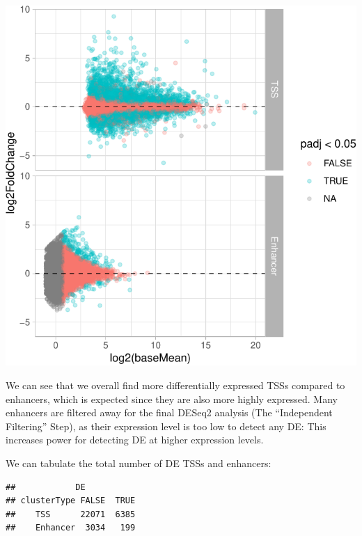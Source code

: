 \documentclass[9pt,a4paper,]{extarticle}
\newenvironment{Shaded}{\begin{snugshade}}{\end{snugshade}}
\newcommand{\KeywordTok}[1]{\textcolor[rgb]{0.13,0.29,0.53}{\textbf{{#1}}}}
\newcommand{\DataTypeTok}[1]{\textcolor[rgb]{0.13,0.29,0.53}{{#1}}}
\newcommand{\FloatTok}[1]{\textcolor[rgb]{0.00,0.00,0.81}{{#1}}}
\newcommand{\NormalTok}[1]{{#1}}
\begin{document}
\begin{center}\includegraphics{CAGEWorkflow_files/figure-latex/MAplot-1} \end{center}

We can see that we overall find more differentially expressed TSSs compared to enhancers, which is expected since they are also more highly expressed. Many enhancers are filtered away for the final DESeq2 analysis (The ``Independent Filtering'' Step), as their expression level is too low to detect any DE: This increases power for detecting DE at higher expression levels.

We can tabulate the total number of DE TSSs and enhancers:

\begin{Shaded}
\end{Shaded}

\begin{verbatim}
##            DE
## clusterType FALSE  TRUE
##    TSS      22071  6385
##    Enhancer  3034   199
\end{verbatim}
\end{document}
